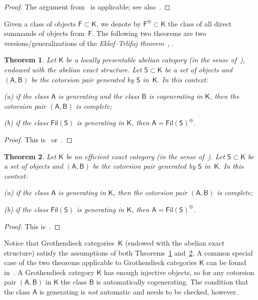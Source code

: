 \documentclass[12pt,a4paper]{amsart}
\newcommand{\+}{\nobreakdash-}
\renewcommand{\:}{\colon}
\newcommand{\sA}{\mathsf A}
\newcommand{\sB}{\mathsf B}
\newcommand{\sF}{\mathsf F}
\newcommand{\sK}{\mathsf K}
\newcommand{\sS}{\mathsf S}
\newcommand{\Fil}{\mathsf{Fil}}
\theoremstyle{plain}
\newtheorem{thm}{Theorem}[section]
\theoremstyle{definition}
\begin{document}
\begin{proof}
 The argument from~\cite[Lemma~4.5]{PR} is applicable; see
also~\cite[Lemma~7.5]{PS6}.
\end{proof}

 Given a class of objects $\sF\subset\sK$, we denote by $\sF^\oplus
\subset\sK$ the class of all direct summands of objects from~$\sF$.
 The following two theorems are two versions/generalizations of
the \emph{Eklof--Trlifaj theorem}~\cite[Theorems~2 and~10]{ET},
\cite[Theorem~6.11 and Corollary~6.13]{GT}.

\begin{thm} \label{loc-pres-eklof-trlifaj}
 Let\/ $\sK$ be a locally presentable abelian category (in the sense
of\/~\cite[Definition~1.17 or Theorem~1.20]{AR}), endowed with
the abelian exact structure.
 Let\/ $\sS\subset\sK$ be a \emph{set} of objects and $(\sA,\sB)$ be
the cotorsion pair generated by\/ $\sS$ in\/~$\sK$.
 In this context: \par
\textup{(a)} if the class\/ $\sA$ is generating and the class\/ $\sB$
is cogenerating in\/ $\sK$, then the cotorsion pair $(\sA,\sB)$ is
complete; \par
\textup{(b)} if the class\/ $\Fil(\sS)$ is generating in\/ $\sK$,
then\/ $\sA=\Fil(\sS)^\oplus$.
\end{thm}

\begin{proof}
 This is~\cite[Corollary~3.6 and Theorem~4.8(d)]{PR}
or~\cite[Theorems~3.3 and~3.4]{PS4}.
\end{proof}

\begin{thm} \label{efficient-eklof-trlifaj}
 Let\/ $\sK$ be an efficient exact category (in the sense
of\/~\cite[Definition~3.4]{Sto-ICRA}).
 Let\/ $\sS\subset\sK$ be a \emph{set} of objects and $(\sA,\sB)$ be
the cotorsion pair generated by\/ $\sS$ in\/~$\sK$.
 In this context: \par
\textup{(a)} if the class\/ $\sA$ is generating in\/ $\sK$, then
the cotorsion pair $(\sA,\sB)$ is complete; \par
\textup{(b)} if the class\/ $\Fil(\sS)$ is generating in\/ $\sK$,
then\/ $\sA=\Fil(\sS)^\oplus$.
\end{thm}

\begin{proof}
 This is~\cite[Theorem~5.16]{Sto-ICRA}.
\end{proof}

 Notice that Grothendieck categories~$\sK$ (endowed with the abelian
exact structure) satisfy the assumptions of both
Theorems~\ref{loc-pres-eklof-trlifaj} and~\ref{efficient-eklof-trlifaj}.
 A common special case of the two theorems applicable to Grothendieck
categories $\sK$ can be found in~\cite[Proposition~2.4]{Gil3}.
 A Grothendieck category $\sK$ has enough injective objects, so
for any cotorsion pair $(\sA,\sB)$ in $\sK$ the class $\sB$ is
automatically cogenerating.
 The condition that the class $\sA$ is generating is \emph{not}
automatic and needs to be checked, however.
\end{document}
